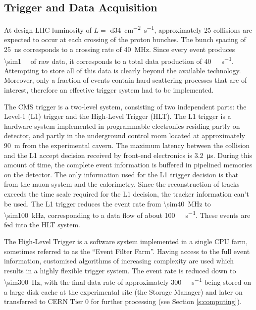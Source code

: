 \subsection{Trigger and Data Acquisition}
\label{ss:trigger_daq}
At design LHC luminosity of $L = $ \SI{d34}{\cm^{-2} s^{-1}}, approximately \num{25} collisions are expected to occur at
each crossing of the proton bunches. The bunch spacing of \SI{25}{\ns} corresponds to a crossing rate of
\SI{40}{\mega\hertz}. Since every event produces \SI{\sim1}{\mega\byte} of raw data, it corresponds to a total data
production of \SI{40}{\tera\byte\per\second}. Attempting to store all of this data is clearly beyond the available
technology. Moreover, only a fraction of events contain hard scattering processes that are of interest, therefore an
effective trigger system had to be implemented.

The CMS trigger is a two-level system, consisting of two independent parts: the Level-1 (L1) trigger and the High-Level
Trigger (HLT). The L1 trigger is a hardware system implemented in programmable electronics residing partly on detector,
and partly in the underground control room located at approximately \SI{90}{\metre} from the experimental cavern. The
maximum latency between the collision and the L1 accept decision received by front-end electronics is
\SI{3.2}{\micro\second}. During this amount of time, the complete event information is buffered in pipelined memories
on the detector. The only information used for the L1 trigger decision is that from the muon system and the calorimetry.
Since the reconstruction of tracks exceeds the time scale required for the L1 decision, the tracker information can't be
used. The L1 trigger reduces the event rate from \SI{\sim40}{\mega\hertz} to \SI{\sim100}{\kilo\hertz}, corresponding to
a data flow of about \SI{100}{\giga\byte\per\second}. These events are fed into the HLT system.

The High-Level Trigger is a software system implemented in a single CPU farm, sometimes referred to as the ``Event
Filter Farm''. Having access to the full event information, customised algorithms of increasing complexity are used
which results in a highly flexible trigger system. The event rate is reduced down to \SI{\sim300}{\Hz}, with the final
data rate of approximately \SI{300}{\mega\byte\per\second} being stored on a large disk cache at the experimental site
(the Storage Manager) and later on transferred to CERN Tier 0 for further processing (see Section \ref{s:computing}).

